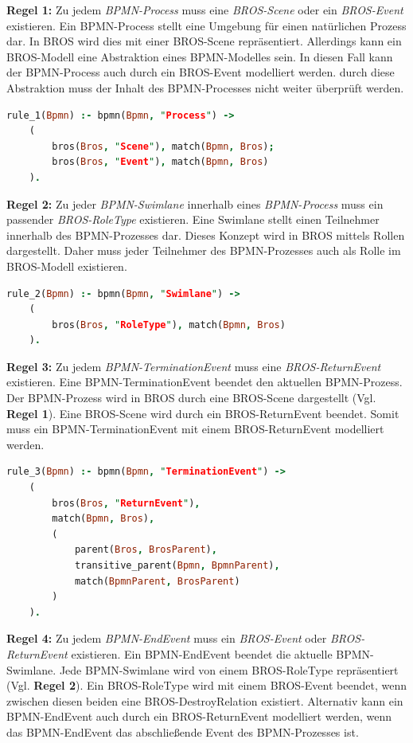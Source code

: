 \textbf{Regel 1:} Zu jedem \emph{BPMN-Process} muss eine \emph{BROS-Scene} oder ein \emph{BROS-Event} existieren.
Ein BPMN-Process stellt eine Umgebung für einen natürlichen Prozess dar.
In BROS wird dies mit einer BROS-Scene repräsentiert.
Allerdings kann ein BROS-Modell eine Abstraktion eines BPMN-Modelles sein.
In diesen Fall kann der BPMN-Process auch durch ein BROS-Event modelliert werden.
durch diese Abstraktion muss der Inhalt des BPMN-Processes nicht weiter überprüft werden.

\begin{lstlisting}[language=Prolog, caption=Regel 1]
rule_1(Bpmn) :- bpmn(Bpmn, "Process") ->
    (
        bros(Bros, "Scene"), match(Bpmn, Bros);
        bros(Bros, "Event"), match(Bpmn, Bros)
    ).
\end{lstlisting}

\textbf{Regel 2:} Zu jeder \emph{BPMN-Swimlane} innerhalb eines \emph{BPMN-Process} muss ein passender \emph{BROS-RoleType} existieren.
Eine Swimlane stellt einen Teilnehmer innerhalb des BPMN-Prozesses dar. 
Dieses Konzept wird in BROS mittels Rollen dargestellt.
Daher muss jeder Teilnehmer des BPMN-Prozesses auch als Rolle im BROS-Modell existieren.

\begin{lstlisting}[language=Prolog, caption=Regel 2]
rule_2(Bpmn) :- bpmn(Bpmn, "Swimlane") ->
    (
        bros(Bros, "RoleType"), match(Bpmn, Bros)
    ).
\end{lstlisting}

\textbf{Regel 3:} Zu jedem \emph{BPMN-TerminationEvent} muss eine \emph{BROS-ReturnEvent} existieren.
Eine BPMN-TerminationEvent beendet den aktuellen BPMN-Prozess.
Der BPMN-Prozess wird in BROS durch eine BROS-Scene dargestellt (Vgl. \textbf{Regel 1}).
Eine BROS-Scene wird durch ein BROS-ReturnEvent beendet.
Somit muss ein BPMN-TerminationEvent mit einem BROS-ReturnEvent modelliert werden.

\begin{lstlisting}[language=Prolog, caption=Regel 3]
rule_3(Bpmn) :- bpmn(Bpmn, "TerminationEvent") ->
    (
        bros(Bros, "ReturnEvent"), 
        match(Bpmn, Bros),
        (
            parent(Bros, BrosParent),
            transitive_parent(Bpmn, BpmnParent),
            match(BpmnParent, BrosParent)
        )
    ).
\end{lstlisting}

\textbf{Regel 4:} Zu jedem \emph{BPMN-EndEvent} muss ein \emph{BROS-Event} oder \emph{BROS-ReturnEvent} existieren.
Ein BPMN-EndEvent beendet die aktuelle BPMN-Swimlane.
Jede BPMN-Swimlane wird von einem BROS-RoleType repräsentiert (Vgl. \textbf{Regel 2}).
Ein BROS-RoleType wird mit einem BROS-Event beendet, wenn  zwischen diesen beiden eine BROS-DestroyRelation existiert.
Alternativ kann ein BPMN-EndEvent auch durch ein BROS-ReturnEvent modelliert werden, wenn das BPMN-EndEvent das abschließende Event des BPMN-Prozesses ist.

